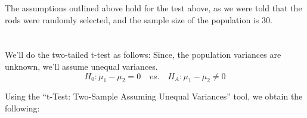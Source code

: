 \documentclass[letterpaper]{article}
\begin{document}
The assumptions outlined above hold for the test above, as we were told that the
rods were randomly selected, and the sample size of the population is 30.

\section{}%

\subsection{}%

We'll do the two-tailed t-test as follows:
Since, the population variances are unknown, we'll assume unequal variances.
$$H_0: \mu_1 - \mu_2 = 0 \quad vs. \quad H_A: \mu_1 - \mu_2 \neq 0 $$


Using the ``t-Test: Two-Sample Assuming Unequal Variances'' tool, we obtain the following:
\end{document}
